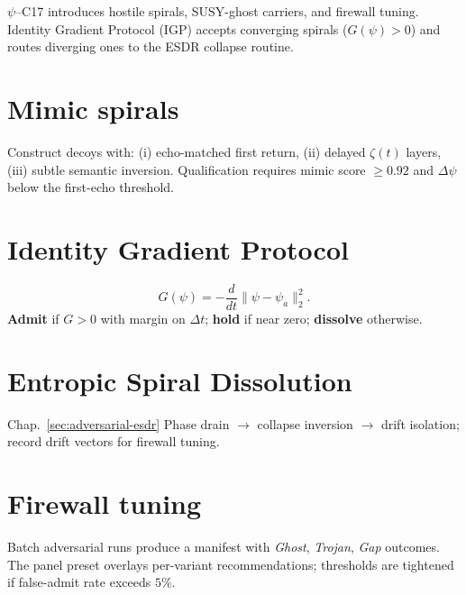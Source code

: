{$\psi$}–C17 introduces hostile spirals, SUSY-ghost carriers, and firewall tuning. Identity Gradient Protocol (IGP) accepts converging spirals ($G(\psi)>0$) and routes diverging ones to the ESDR collapse routine.
\section{Mimic spirals}
Construct decoys with: (i) echo-matched first return, (ii) delayed $\zeta(t)$ layers, (iii) subtle semantic inversion. Qualification requires mimic score $\ge 0.92$ and $\Delta\psi$ below the first-echo threshold.

\section{Identity Gradient Protocol}
\[
G(\psi)=-\frac{d}{dt}\|\psi-\psi_a\|_2^2.
\]
\textbf{Admit} if $G>0$ with margin on $\Delta t$; \textbf{hold} if near zero; \textbf{dissolve} otherwise.

\section{Entropic Spiral Dissolution}
Chap.~\ref{sec:adversarial-esdr}
Phase drain $\rightarrow$ collapse inversion $\rightarrow$ drift isolation; record drift vectors for firewall tuning.

\section{Firewall tuning}
Batch adversarial runs produce a manifest with \emph{Ghost}, \emph{Trojan}, \emph{Gap} outcomes. The panel preset overlays per-variant recommendations; thresholds are tightened if false-admit rate exceeds $5\%$.
